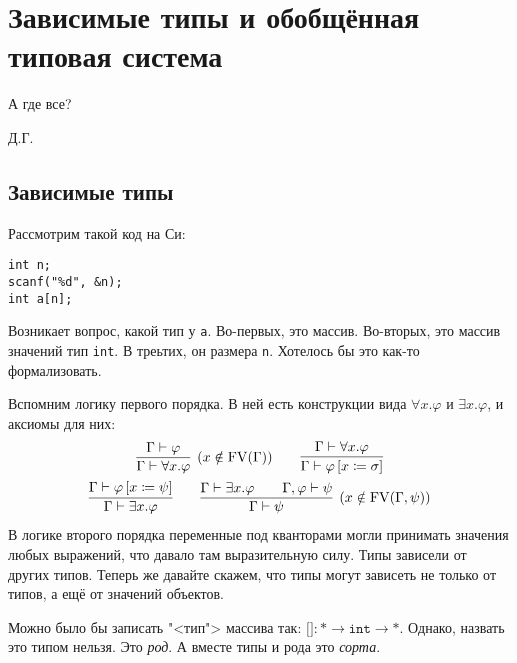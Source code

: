 \section{\texorpdfstring{Зависимые типы и обобщённая типовая система}{Dependent types and generalized type systems}}
\epigraph{А где все?}{Д.Г.}

\subsection{\texorpdfstring{Зависимые типы}{Dependent types}}

Рассмотрим такой код на Си:
\begin{verbatim}
int n;
scanf("%d", &n);
int a[n];
\end{verbatim}
Возникает вопрос, какой тип у \texttt{a}.
Во-первых, это массив. Во-вторых, это массив значений тип \texttt{int}. В треьтих, он размера \texttt{n}.
Хотелось бы это как-то формализовать.

\begin{@empty}
Вспомним логику первого порядка.
В ней есть конструкции вида $\forall x . \varphi$ и $\exists x . \varphi$, и аксиомы для них: %
\inferspacing
\begin{gather*}
    \infer[(x \notin \FV(\Gamma))]{\Gamma \vdash \forall x . \varphi}{\Gamma \vdash \varphi} \qquad
    \infer{\Gamma \vdash \varphi \left[x \coloneqq \sigma\right]}{\Gamma \vdash \forall x . \varphi} \\
    \infer{\Gamma \vdash \exists x . \varphi}{\Gamma \vdash \varphi \left[x \coloneqq \psi\right]} \qquad
    \infer[(x \notin \FV(\Gamma, \psi))]{\Gamma \vdash \psi}{\Gamma \vdash \exists x . \varphi && \Gamma, \varphi \vdash \psi}
\end{gather*}
В логике второго порядка переменные под кванторами могли принимать значения любых выражений, что давало там выразительную силу.
Типы зависели от других типов.
Теперь же давайте скажем, что типы могут зависеть не только от типов, а ещё от значений объектов.
\end{@empty}

Можно было бы записать "<тип"> массива так: $\texttt{[]}: * \rightarrow \mathtt{int} \rightarrow *$.
Однако, назвать это типом нельзя. Это \emph{род}. А вместе типы и рода это \emph{сорта}.

